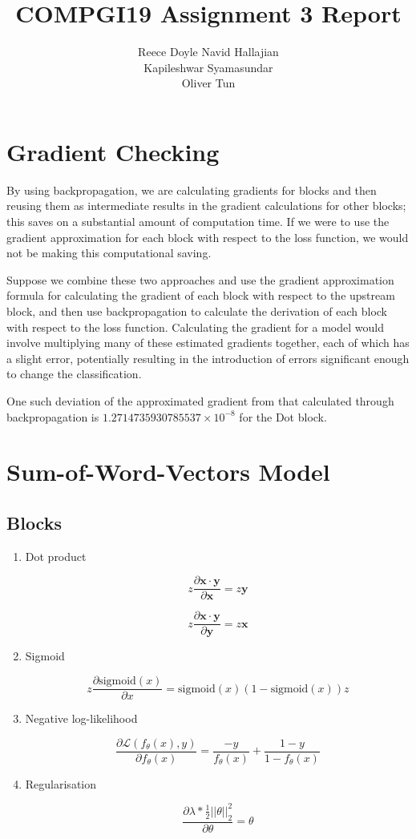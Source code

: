\documentclass{article} %
\title{COMPGI19 Assignment 3 Report}
\author{
Reece Doyle
\And
Navid Hallajian \\
\And
Kapileshwar Syamasundar \\
\And
Oliver Tun \\
}
\begin{document}
\maketitle

\section{Gradient Checking}
By using backpropagation, we are calculating gradients for blocks and then reusing them as intermediate results in the gradient calculations for other blocks; this saves on a substantial amount of computation time. If we were to use the gradient approximation for each block with respect to the loss function, we would not be making this computational saving.

Suppose we combine these two approaches and use the gradient approximation formula for calculating the gradient of each block with respect to the upstream block, and then use backpropagation to calculate the derivation of each block with respect to the loss function. Calculating the gradient for a model would involve multiplying many of these estimated gradients together, each of which has a slight error, potentially resulting in the introduction of errors significant enough to change the classification.

One such deviation of the approximated gradient from that calculated through backpropagation is $1.2714735930785537 \times 10^{-8}$ for the Dot block.

\section{Sum-of-Word-Vectors Model}

\subsection{Blocks}

\begin{enumerate}

\item Dot product

\[ z \frac{\partial {\mathbf{x} \cdot \mathbf{y}}}{\partial{\mathbf{x}}} = z \mathbf{y}  \]

\[ z \frac{\partial {\mathbf{x} \cdot \mathbf{y}}}{\partial{\mathbf{y}}} = z \mathbf{x} \]

\item Sigmoid

\[z \frac{\partial \text{sigmoid} (x)}{\partial{x}} =  \text{sigmoid}(x) (1 - \text{sigmoid}(x)) z\]

\item Negative log-likelihood

\[ \frac{\partial \mathcal{L}(f_{\theta}(x), y)}{\partial{f_{\theta}(x)}} = \frac{-y}{f_{\theta}(x)} + \frac{1 - y}{1 - f_{\theta}(x)} \]

\item Regularisation

\[ \frac{\partial \lambda * \frac{1}{2} {|| \theta ||}^2_2}{\partial \theta} = \theta \]

\end{enumerate}
\end{document}
